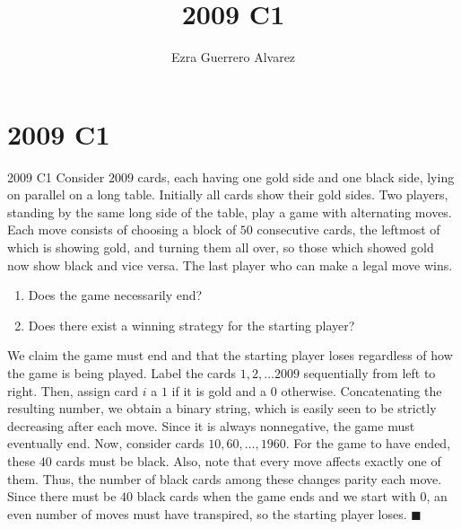 \documentclass[14pt]{article}
\title{2009 C1}
\author{Ezra Guerrero Alvarez}
\begin{document}
\maketitle
	
\section*{2009 C1}

\begin{statement}{2009 C1}
	Consider $2009$ cards, each having one gold side and one black side,
	lying on parallel on a long table.
	Initially all cards show their gold sides.
	Two players, standing by the same long side of the table,
	play a game with alternating moves.
	Each move consists of choosing a block of $50$ consecutive cards,
	the leftmost of which is showing gold, and
	turning them all over,
	so those which showed gold now show black and vice versa.
	The last player who can make a legal move wins.
	
	\begin{enumerate}[label=(\alph*)]
		\item Does the game necessarily end?
		\item Does there exist a winning strategy for the starting player?
	\end{enumerate}
\end{statement}
We claim the game must end and that the starting player loses regardless of how the game is being played. Label the cards $1,2,\ldots 2009$ sequentially from left to right. Then, assign card $i$ a $1$ if it is gold and a $0$ otherwise. Concatenating the resulting number, we obtain a binary string, which is easily seen to be strictly decreasing after each move. Since it is always nonnegative, the game must eventually end. Now, consider cards $10, 60, \ldots, 1960$. For the game to have ended, these $40$ cards must be black. Also, note that every move affects exactly one of them. Thus, the number of black cards among these changes parity each move. Since there must be $40$ black cards when the game ends and we start with $0$, an even number of moves must have transpired, so the starting player loses. $\blacksquare$
	
\end{document}
